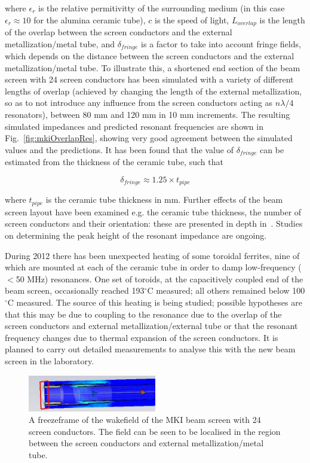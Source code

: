 \documentclass{JAC2003}
\begin{document}
where $\epsilon_{r}$ is the relative permitivitty of the surrounding medium (in this case $\epsilon_{r} \approx 10$ for the alumina ceramic tube), $c$ is the speed of light, $L_{overlap}$ is the length of the overlap between the screen conductors and the external metallization/metal tube, and $\delta_{fringe}$ is a factor to take into account fringe fields, which depends on the distance between the screen conductors and the external metallization/metal tube. To illustrate this, a shortened end section of the beam screen with 24 screen conductors has been simulated with a variety of different lengths of overlap (achieved by changing the length of the external metallization, so as to not introduce any influence from the screen conductors acting as $n \lambda /4$ resonators), between 80 mm and 120 mm in 10 mm increments. The resulting simulated impedances and predicted resonant frequencies are shown in Fig.~\ref{fig:mkiOverlapRes}, showing very good agreement between the simulated values and the predictions. It has been found that the value of $\delta_{fringe}$ can be estimated from the thickness of the ceramic tube, such that

\begin{equation}
\delta_{fringe} \approx 1.25 \times t_{pipe}
\end{equation}

where $t_{pipe}$ is the ceramic tube thickness in mm. Further effects of the beam screen layout have been examined e.g. the ceramic tube thickness, the number of screen conductors and their orientation: these are presented in depth in~\cite{DayThesis}. Studies on determining the peak height of the resonant impedance are ongoing. 

During 2012 there has been unexpected heating of some toroidal ferrites, nine of which are mounted at each of the ceramic tube in order to damp low-frequency ($<$50 MHz) resonances. One set of toroids, at the capacitively coupled end of the beam screen, occasionally reached 193$^{\circ}$C measured; all others remained below 100$^{\circ}$C measured. The source of this heating is being studied; possible hypotheses are that this may be due to coupling to the resonance due to the overlap of the screen conductors and external metallization/external tube or that the resonant frequency changes due to thermal expansion of the screen conductors. It is planned to carry out detailed measurements to analyse this with the new beam screen in the laboratory.

\begin{figure}
\includegraphics[width=0.5\textwidth]{resField.jpeg}
\caption{A freezeframe of the wakefield of the MKI beam screen with 24 screen conductors. The field can be seen to be localised in the region between the screen conductors and external metallization/metal tube.}
\label{fig:mkiResFieldPat}
\end{figure}
\end{document}
